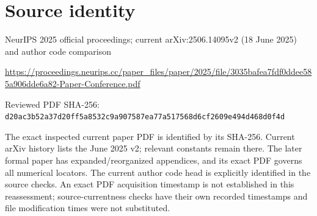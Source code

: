 \documentclass[11pt]{article}
\begin{document}
\section*{Source identity}

NeurIPS 2025 official proceedings; current arXiv:2506.14095v2 (18 June 2025) and author code comparison

\url{https://proceedings.neurips.cc/paper_files/paper/2025/file/3035bafea7fdf0ddee585a906dde6a82-Paper-Conference.pdf}

Reviewed PDF SHA-256: \nolinkurl{d20ac3b52a37d20ff5a8532c9a907587ea77a517568d6cf2609e494d468d0f4d}

The exact inspected current paper PDF is identified by its SHA-256. Current arXiv history lists the June 2025 v2; relevant constants remain there. The later formal paper has expanded/reorganized appendices, and its exact PDF governs all numerical locators. The current author code head is explicitly identified in the source checks. An exact PDF acquisition timestamp is not established in this reassessment; source-currentness checks have their own recorded timestamps and file modification times were not substituted.
\end{document}
